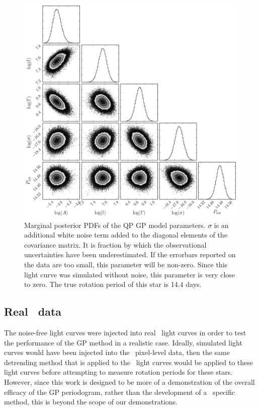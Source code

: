 \begin{figure}
\begin{center}
\includegraphics[width=6in, clip=true]{figures/demo_triangle.pdf}
\caption{Marginal posterior PDFs of the QP GP model parameters. $\sigma$ is an
additional white noise term added to the diagonal elements of the covariance
matrix. It is fraction by which the observational uncertainties have been
underestimated. If the errorbars reported on the data are too small, this
parameter will be non-zero. Since this light curve was simulated without
noise, this parameter is very close to zero.
The true rotation period of this star is 14.4 days.}
\end{center}
\end{figure}
\label{fig:gp_posteriors}

\subsection{Real \kepler\ data}

The noise-free light curves were injected into real \kepler\ light curves in
order to test the performance of the GP method in a realistic case.
Ideally, simulated light curves would have been injected into the \kepler\
pixel-level data, then the same detrending method that is applied to the
\kepler\ light curves would be applied to these light curves before attempting
to measure rotation periods for these stars.
However, since this work is designed to be more of a demonstration of the
overall efficacy of the GP periodogram, rather than the development of a
\Kepler\ specific method, this is beyond the scope of our demonstrations.


